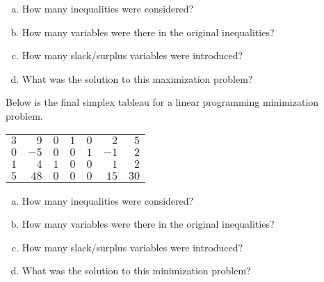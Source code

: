 \documentclass[11pt,letterpaper]{article}
\begin{document}
\begin{enumerate}[(a)]
\item How many inequalities were considered?
\item How many variables were there in the original inequalities?
\item How many slack/surplus variables were introduced?
\item What was the solution to this maximization problem?
\end{enumerate}



\newpage



 Below is the final simplex tableau for a linear programming minimization problem. \par
	\begin{table}[H]
	\centering
	\begin{tabular}{rrrrrrr}
	$3$ & $9$ & $0$ & $1$ & $0$ & $2$ & $5$ \\
	$0$ & $-5$ & $0$ & $0$ & $1$ & $-1$ & $2$ \\
	$1$ & $4$ & $1$ & $0$ & $0$ & $1$ & $2$ \\
	$5$ & $48$ & $0$ & $0$ & $0$ & $15$ & $30$
	\end{tabular}
	\end{table}

\begin{enumerate}[(a)]
\item How many inequalities were considered?
\item How many variables were there in the original inequalities?
\item How many slack/surplus variables were introduced?
\item What was the solution to this minimization problem?
\end{enumerate}
\end{document}
